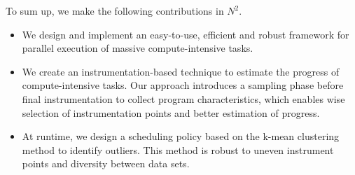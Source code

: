 To sum up, we make the following contributions in $N^2$.
\begin{itemize}
\item We design and implement an easy-to-use, efficient and robust framework for parallel execution of massive compute-intensive tasks.
\item We create an instrumentation-based technique to estimate the progress of compute-intensive tasks. Our approach introduces a sampling phase before final instrumentation to collect program characteristics, which enables wise selection of instrumentation points and better estimation of progress.
\item At runtime, we design a scheduling policy based on the k-mean clustering method to identify outliers. This method is robust to uneven instrument points and diversity between data sets.
\end{itemize}

